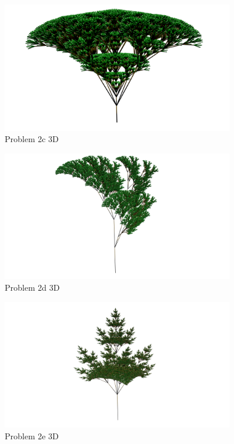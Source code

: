 \begin{figure}[H]
    \centering
    \includegraphics[width=0.90\textwidth]{figures/L-systems/c3d.png}
    \caption{Problem 2c 3D}\label{fig:prob2c_3d}
\end{figure}

\begin{figure}[H]
    \centering
    \includegraphics[width=0.90\textwidth]{figures/L-systems/d3d.png}
    \caption{Problem 2d 3D}\label{fig:prob2d_3d}
\end{figure}

\begin{figure}[H]
    \centering
    \noindent\includegraphics[width=0.90\textwidth]{figures/L-systems/e3d.png}
    \caption{Problem 2e 3D}\label{fig:prob2e_3d}
\end{figure}

